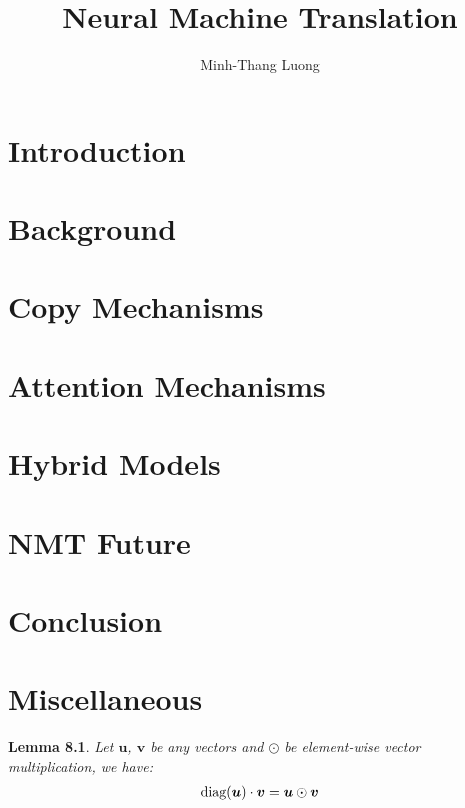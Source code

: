 \documentclass[12pt]{report}
\newtheorem{lemma}{Lemma}
\begin{document}
\title{Neural Machine Translation}
\author{Minh-Thang Luong}

\beforepreface
%
%
\afterpreface


\chapter{Introduction}
\label{c:intro}


\chapter{Background}
\label{c:background}


\chapter{Copy Mechanisms}
\label{c:copy}


\chapter{Attention Mechanisms}
\label{c:attention}


\chapter{Hybrid Models}
\label{c:hybrid}


\chapter{NMT Future}
\label{c:future}


\chapter{Conclusion}
\label{c:conclude}



\appendix
\chapter{Miscellaneous}
\label{c:misc}
\begin{lemma}
\label{l:diag_mul}
Let $\bm{u}$, $\bm{v}$ be any vectors and $\odot$ be element-wise vector multiplication, we have:
\begin{align}
\text{diag} (\bm{u}) \cdot \bm{v} = \bm{u} \odot \bm{v}
\end{align}
\end{lemma}
\end{document}
